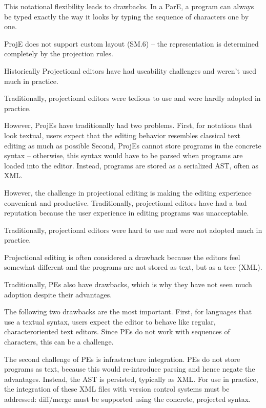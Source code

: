 This notational flexibility leads to drawbacks.
In a ParE, a program can always be typed exactly the way it looks by typing the sequence of characters one by one.

ProjE does not support custom layout (SM.6) – the representation is determined completely by the projection rules.

Historically Projectional editors have had useability challenges and weren't used much in practice.  

Traditionally, projectional editors were tedious to use and were hardly adopted in practice.



However, ProjEs have traditionally had two problems.
First, for notations that look textual, users expect that the editing behavior resembles classical text editing as much as possible 
Second, ProjEs cannot store programs in the concrete syntax – otherwise, this syntax would have to be parsed when programs are loaded into the editor.
Instead, programs are stored as a serialized AST, often as XML. 

However, the challenge in projectional editing is making the editing experience convenient and productive.
Traditionally, projectional editors have had a bad reputation because the user experience in editing programs was unacceptable.


Traditionally, projectional editors were hard to use and were not adopted much in practice.

Projectional editing is often considered a drawback because the editors feel somewhat different and the programs are not stored as text, but as a tree (XML).

Traditionally, PEs also have drawbacks, which is why they have not seen much adoption despite their advantages.

The following two drawbacks are the most important.
First, for languages that use a textual syntax, users expect the editor to behave like regular, characteroriented text editors.
Since PEs do not work with sequences of characters, this can be a challenge. 


The second challenge of PEs is infrastructure integration.
PEs do not store programs as text, because this would re-introduce parsing and hence negate the advantages.
Instead, the AST is persisted, typically as XML.
For use in practice, the integration of these XML files with version control systems must be addressed: diff/merge must be supported using the concrete, projected syntax.


